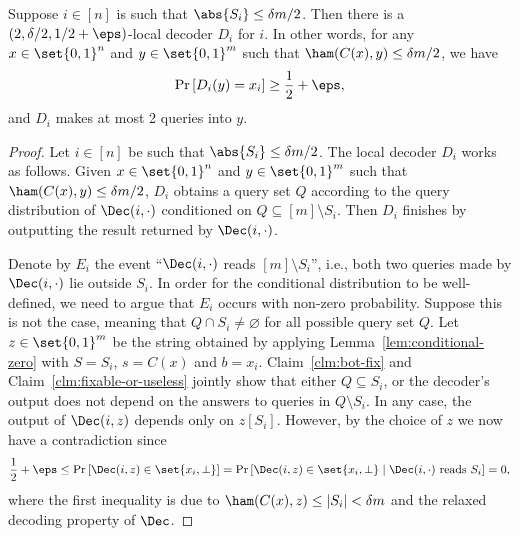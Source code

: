 \begin{lemma} \label{lem:LDC-reduction}
	Suppose $i \in [n]$ is such that $\abs{S_{i}} \le \delta m/2$. Then there is a $(2,\delta/2,1/2+\eps)$-local decoder $D_i$ for $i$. In other words, for any $x \in \set{0,1}^{n}$ and $y \in \set{0,1}^{m}$ such that $\ham(C(x), y) \le \delta m/2$, we have
	\begin{align*}
	    \Pr\left[ D_i(y) = x_i \right] \ge \frac{1}{2} + \eps,
	\end{align*}
	and $D_i$ makes at most 2 queries into $y$.
\end{lemma}
\begin{proof}
	Let $i \in [n]$ be such that $\abs{S_{i}} \le \delta m/2$.
	The local decoder $D_i$ works as follows. Given $x \in \set{0,1}^{n}$ and $y \in \set{0,1}^{m}$ such that $\ham(C(x), y) \le \delta m/2$, $D_i$ obtains a query set $Q$ according to the query distribution of $\Dec(i,\cdot)$ conditioned on $Q \subseteq [m]\setminus S_i$. Then $D_i$ finishes by outputting the result returned by $\Dec(i,\cdot)$. 
	
	
	
	Denote by $E_i$ the event ``$\Dec(i,\cdot)$ reads $[m]\setminus S_i$'', i.e., both two queries made by $\Dec(i,\cdot)$ lie outside $S_i$. In order for the conditional distribution to be well-defined, we need to argue that $E_i$ occurs with non-zero probability. Suppose this is not the case, meaning that $Q \cap S_i \neq \varnothing$ for all possible query set $Q$. Let $z \in \set{0,1}^m$ be the string obtained by applying Lemma~\ref{lem:conditional-zero} with $S = S_i$, $s=C(x)$ and $b=x_i$. Claim~\ref{clm:bot-fix} and Claim~\ref{clm:fixable-or-useless} jointly show that either $Q \subseteq S_i$, or the decoder's output does not depend on the answers to queries in $Q \setminus S_i$. In any case, the output of $\Dec(i,z)$ depends only on $z[S_i]$. However, by the choice of $z$ we now have a contradiction since 
	\begin{align*}
		\frac{1}{2} + \eps \le \Pr\left[ \Dec(i,z) \in \set{x_i, \perp} \right] = \Pr\left[ \Dec(i,z) \in \set{x_i, \perp} \mid \Dec(i,\cdot)\textup{ reads }S_i \right] = 0,
	\end{align*}
	where the first inequality is due to $\ham(C(x),z)\le |S_i| < \delta m$ and the relaxed decoding property of $\Dec$.
	

\end{proof}
